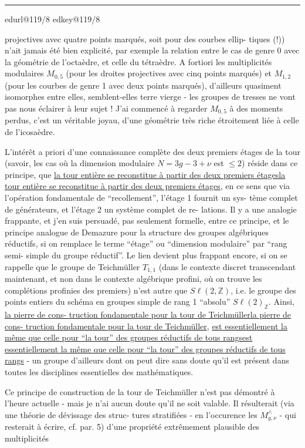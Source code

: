 \documentclass[11pt,a4paper]{article}
\makeatletter
\newif\ifreading
\newif\ifenglish
\def\CurrentScanURL{}
\def\CurrentPageKey{}
\def\CurrentApparatus{}
\newcommand{\scanpage}[1]{%
  \clearpage
  \expandafter\let\expandafter\CurrentScanURL\csname edurl@#1\endcsname
  \expandafter\let\expandafter\CurrentPageKey\csname edkey@#1\endcsname
  \def\CurrentApparatus{}%
  \hypertarget{scan-\CurrentPageKey}{}%
  \typeout{EDITION-SCAN: \CurrentPageKey; PDFPAGE: \the\numexpr\ReadonlyShipoutCounter+1\relax}%
  \ifreading
    \marginnote{\raggedright\scriptsize\sffamily\href{\CurrentScanURL}{119 / \csname edpage@#1\endcsname}}%
  \else
    \noindent{\small\sffamily\href{\CurrentScanURL}{[scan #1]}}\par\smallskip
  \fi}
\newcommand{\mspage}[1]{%
  \ifreading\marginnote{\raggedright\scriptsize\sffamily p.\,#1}[2\baselineskip]%
  \else\noindent{\small\sffamily[p.\,#1]}\par\smallskip\fi}
\let\TextUline\uline
\renewcommand{\uline}[1]{\ifmmode\underline{#1}\else\TextUline{#1}\fi}
\newcommand{\margin}[1]{%
  \sbox{\MarginalTestBox}{\parbox{\marginparwidth}{\raggedright\footnotesize#1}}%
  \ifdim\dimexpr\ht\MarginalTestBox+\dp\MarginalTestBox\relax>3\baselineskip
    \par\smallskip\noindent\begin{minipage}{\linewidth}\hrule\smallskip
    {\footnotesize\textcolor{HandInk}{\ifenglish Marginal note:\else Note marginale :\fi\ #1}}\smallskip\hrule\end{minipage}\par\smallskip
  \else
    \marginnote{\raggedright\footnotesize\textcolor{HandInk}{#1}}%
  \fi}
\newcommand{\finishscan}{\ifx\CurrentApparatus\empty\else\par\bigskip\noindent\rule{.35\linewidth}{.35pt}\par\smallskip{\footnotesize\setlength{\parskip}{3pt}\CurrentApparatus}\fi}
\makeatother
\begin{document}
\margin{7}

\finishscan
\scanpage{119/8}
\mspage{6}

projectives avec quatre points marqués, soit pour des courbes ellip-%
tiques (!)) n'ait jamais été bien explicité, par exemple la relation
entre le cas de genre 0 avec la géométrie de l'octaèdre, et celle du
tétraèdre. A fortiori les multiplicités modulaires $M_{0,5}$ (pour les
droites projectives avec cinq points marqués) et $M_{1,2}$ (pour les
courbes de genre 1 avec deux points marqués), d'ailleurs quasiment
isomorphes entre elles, semblent-elles terre vierge - les groupes
de tresses ne vont pas nous éclairer à leur sujet ! J'ai commencé à
regarder $M_{0,5}$ à des moments perdus, c'est un véritable joyau, d'une
géométrie très riche étroitement liée à celle de l'icosaèdre.

L'intérêt a priori d'une connaissance complète des deux
premiers étages de la tour (savoir, les cas où la dimension modulaire
$N = 3g-3+\nu$ est $\leq 2$) réside dans ce principe, que \uline{la tour entière se
reconstitue à partir des deux premiers étages}, en ce sens que via
l'opération fondamentale de ``recollement'', l'étage 1 fournit un sys-%
tème complet de générateurs, et l'étage 2 un système complet de re-%
lations. Il y a une analogie frappante, et j'en suis persuadé, pas
seulement formelle, entre ce principe, et le principe analogue de
Demazure pour la structure des groupes algébriques réductifs, si on
remplace le terme ``étage'' ou ``dimension modulaire'' par ``rang semi-%
simple du groupe réductif''. Le lien devient plus frappant encore,
si on se rappelle que le groupe de Teichmüller $T_{1,1}$ (dans le contexte
discret transcendant maintenant, et non dans le contexte algébrique
profini, où on trouve les complétions profinies des premiers) n'est
autre que $S\ell(2,\mathbb{Z})$, i.e. le groupe des points entiers du schéma en
groupes simple de rang 1 ``absolu'' $S\ell(2)_{\mathbb{Z}}$. Ainsi, \uline{la pierre de cons-%
truction fondamentale pour la tour de Teichmüller}, \uline{est essentiellement
la même que celle pour ``la tour'' des groupes réductifs de tous rangs} -
un groupe d'ailleurs dont on peut dire sans doute qu'il est présent
dans toutes les disciplines essentielles des mathématiques.

Ce principe de construction de la tour de Teichmüller n'est
pas démontré à l'heure actuelle - mais je n'ai aucun doute qu'il ne
soit valable. Il résulterait (via une théorie de dévissage des struc-%
tures stratifiées - en l'occurence les $M^{\wedge}_{g,\nu}$ - qui resterait à écrire,
cf. par. 5) d'une propriété extrêmement plausible des multiplicités
\end{document}
